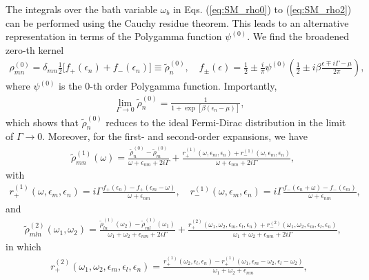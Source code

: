 \documentclass[twocolumn, prx, reprint, amsfonts, amsmath, amssymb, longbibliography, floatfix, aps]{revtex4-2}
\begin{document}
The integrals over the bath variable $\omega_b$ in Eqs. (\ref{eq:SM_rho0}) to (\ref{eq:SM_rho2}) can be performed using the Cauchy residue theorem. This leads to an alternative representation in terms of the Polygamma function $\psi^{(0)}$.  We find the broadened zero-th kernel
\begin{align}
\rho_{m n}^{(0)} = \delta_{m n}
\frac{1}{2}
\Big[
f_+ (\epsilon_n) + f_- (\epsilon_n)
\Big] \equiv \tilde{\rho}_n^{(0)},
\quad
f_\pm (\epsilon) = \frac{1}{2} \pm \frac{i}{\pi}\psi^{(0)}
\left(\frac{1}{2} \pm i\beta \frac{\epsilon \mp i \Gamma -\mu}{2\pi}\right),
\label{rho_0_supp}
\end{align}
where $\psi^{(0)}$ is the 0-th order Polygamma function.
Importantly,
\begin{align}
\lim_{\Gamma \to 0} \tilde{\rho}_n^{(0)} = \frac{1}{1+\exp[\beta (\epsilon_n - \mu)]} ,
\end{align}
which shows that $\tilde{\rho}_n^{(0)}$ reduces to the ideal Fermi-Dirac distribution in the limit of $\Gamma \to 0$.
Moreover, for the first- and second-order expansions, we have 
\begin{align}
& \tilde{\rho}_{m n}^{(1)} (\omega) = 
\frac{ \tilde{\rho}_n^{(0)} - \tilde{\rho}_m^{(0)} }
{ \omega + \epsilon_{n m}  + 2 i \Gamma }
+
\frac{r_+^{(1)} (\omega, \epsilon_m, \epsilon_n) + r_-^{(1)} (\omega, \epsilon_m, \epsilon_n) }
{ \omega + \epsilon_{n m}  + 2 i \Gamma },
\label{tilde-rho_1_supp}
\end{align}
with
\begin{align}
r_+^{(1)} (\omega, \epsilon_m, \epsilon_n) 
= i \Gamma \frac{ f_+ (\epsilon_n) -  f_+ (\epsilon_m - \omega) }{\omega + \epsilon_{n m} },
\quad
r_-^{(1)} (\omega, \epsilon_m, \epsilon_n) 
= i \Gamma \frac{ f_- (\epsilon_n + \omega ) -  f_- (\epsilon_m) }{\omega + \epsilon_{n m} },
\end{align}
and
\begin{align}
& \tilde{\rho}_{m l n}^{(2)} (\omega_1,\omega_2) =  
\frac{ 
\tilde{\rho}_{l n}^{(1)} (\omega_2) - 
\tilde{\rho}_{m l}^{(1)} (\omega_1) 
}
{ \omega_1 + \omega_2 + \epsilon_{n m}  + 2 i \Gamma }
+
\frac{ 
r_+^{(2)}  (\omega_1, \omega_2, \epsilon_m, \epsilon_l, \epsilon_n) 
+ r_-^{(2)}  (\omega_1, \omega_2, \epsilon_m, \epsilon_l, \epsilon_n) }
{ \omega_1 + \omega_2 + \epsilon_{n m}  + 2 i \Gamma },
\end{align}
in which
\begin{align}
r_+^{(2)}  (\omega_1, \omega_2, \epsilon_m, \epsilon_l, \epsilon_n)
= \frac{ 
r_+^{(1)} (\omega_2,\epsilon_l,\epsilon_n)  
- r_+^{(1)} (\omega_1, \epsilon_m - \omega_2, \epsilon_l - \omega_2)  }
{\omega_1 + \omega_2 + \epsilon_{n m} },
\end{align}
\end{document}
